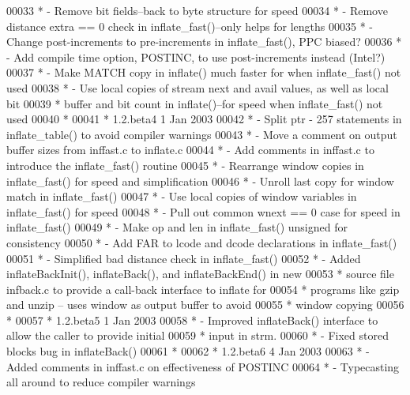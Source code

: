 \begin{DoxyCode}
00033 \textcolor{comment}{ * - Remove bit fields--back to byte structure for speed}
00034 \textcolor{comment}{ * - Remove distance extra == 0 check in inflate\_fast()--only helps for lengths}
00035 \textcolor{comment}{ * - Change post-increments to pre-increments in inflate\_fast(), PPC biased?}
00036 \textcolor{comment}{ * - Add compile time option, POSTINC, to use post-increments instead (Intel?)}
00037 \textcolor{comment}{ * - Make MATCH copy in inflate() much faster for when inflate\_fast() not used}
00038 \textcolor{comment}{ * - Use local copies of stream next and avail values, as well as local bit}
00039 \textcolor{comment}{ *   buffer and bit count in inflate()--for speed when inflate\_fast() not used}
00040 \textcolor{comment}{ *}
00041 \textcolor{comment}{ * 1.2.beta4    1 Jan 2003}
00042 \textcolor{comment}{ * - Split ptr - 257 statements in inflate\_table() to avoid compiler warnings}
00043 \textcolor{comment}{ * - Move a comment on output buffer sizes from inffast.c to inflate.c}
00044 \textcolor{comment}{ * - Add comments in inffast.c to introduce the inflate\_fast() routine}
00045 \textcolor{comment}{ * - Rearrange window copies in inflate\_fast() for speed and simplification}
00046 \textcolor{comment}{ * - Unroll last copy for window match in inflate\_fast()}
00047 \textcolor{comment}{ * - Use local copies of window variables in inflate\_fast() for speed}
00048 \textcolor{comment}{ * - Pull out common wnext == 0 case for speed in inflate\_fast()}
00049 \textcolor{comment}{ * - Make op and len in inflate\_fast() unsigned for consistency}
00050 \textcolor{comment}{ * - Add FAR to lcode and dcode declarations in inflate\_fast()}
00051 \textcolor{comment}{ * - Simplified bad distance check in inflate\_fast()}
00052 \textcolor{comment}{ * - Added inflateBackInit(), inflateBack(), and inflateBackEnd() in new}
00053 \textcolor{comment}{ *   source file infback.c to provide a call-back interface to inflate for}
00054 \textcolor{comment}{ *   programs like gzip and unzip -- uses window as output buffer to avoid}
00055 \textcolor{comment}{ *   window copying}
00056 \textcolor{comment}{ *}
00057 \textcolor{comment}{ * 1.2.beta5    1 Jan 2003}
00058 \textcolor{comment}{ * - Improved inflateBack() interface to allow the caller to provide initial}
00059 \textcolor{comment}{ *   input in strm.}
00060 \textcolor{comment}{ * - Fixed stored blocks bug in inflateBack()}
00061 \textcolor{comment}{ *}
00062 \textcolor{comment}{ * 1.2.beta6    4 Jan 2003}
00063 \textcolor{comment}{ * - Added comments in inffast.c on effectiveness of POSTINC}
00064 \textcolor{comment}{ * - Typecasting all around to reduce compiler warnings}

\end{DoxyCode}
